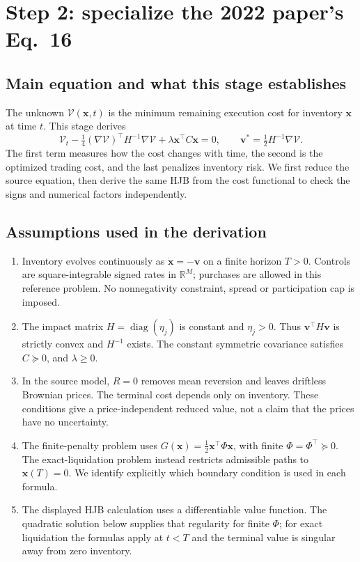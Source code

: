 \section{Step 2: specialize the 2022 paper's Eq.~16}
\label{sec:stage2}

\subsection*{Main equation and what this stage establishes}

The unknown $\mathcal V(\mathbf x,t)$ is the minimum remaining execution
cost for inventory $\mathbf x$ at time $t$. This stage derives
\[
 \boxed{\mathcal V_t-\tfrac14(\nabla\mathcal V)^\top H^{-1}\nabla\mathcal V
 +\lambda\mathbf x^\top C\mathbf x=0,\qquad
 \mathbf v^*=\tfrac12H^{-1}\nabla\mathcal V.}
\]
The first term measures how the cost changes with time, the second is
the optimized trading cost, and the last penalizes inventory risk.
We first reduce the source equation, then derive the same HJB from the
cost functional to check the signs and numerical factors independently.

\subsection*{Assumptions used in the derivation}

\begin{enumerate}
\item Inventory evolves continuously as $\dot{\mathbf x}=-\mathbf v$ on
a finite horizon $T>0$. Controls are square-integrable signed rates in
$\mathbb R^M$; purchases are allowed in this reference problem.
No nonnegativity constraint, spread or participation cap is imposed.
\item The impact matrix $H=\operatorname{diag}(\eta_j)$ is constant and
$\eta_j>0$. Thus $\mathbf v^\top H\mathbf v$ is strictly convex and
$H^{-1}$ exists. The constant symmetric covariance satisfies $C\succeq0$,
and $\lambda\ge0$.
\item In the source model, $R=0$ removes mean reversion and leaves
driftless Brownian prices. The terminal cost depends only on inventory.
These conditions give a price-independent reduced value, not a claim
that the prices have no uncertainty.
\item The finite-penalty problem uses
$G(\mathbf x)=\tfrac12\mathbf x^\top\Phi\mathbf x$, with finite
$\Phi=\Phi^\top\succeq0$. The exact-liquidation problem instead restricts
admissible paths to $\mathbf x(T)=0$. We identify explicitly which
boundary condition is used in each formula.
\item The displayed HJB calculation uses a differentiable value function.
The quadratic solution below supplies that regularity for finite $\Phi$;
for exact liquidation the formulas apply at $t<T$ and the terminal
value is singular away from zero inventory.
\end{enumerate}

